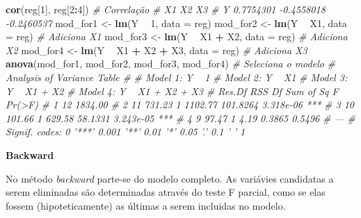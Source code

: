 \documentclass[
]{book}
\newenvironment{Shaded}{\begin{snugshade}}{\end{snugshade}}
\newcommand{\CommentTok}[1]{\textcolor[rgb]{0.56,0.35,0.01}{\textit{#1}}}
\newcommand{\DataTypeTok}[1]{\textcolor[rgb]{0.13,0.29,0.53}{#1}}
\newcommand{\DecValTok}[1]{\textcolor[rgb]{0.00,0.00,0.81}{#1}}
\newcommand{\KeywordTok}[1]{\textcolor[rgb]{0.13,0.29,0.53}{\textbf{#1}}}
\newcommand{\NormalTok}[1]{#1}
\newcommand{\OperatorTok}[1]{\textcolor[rgb]{0.81,0.36,0.00}{\textbf{#1}}}
\newcommand{\StringTok}[1]{\textcolor[rgb]{0.31,0.60,0.02}{#1}}
\begin{document}
\begin{Shaded}
\begin{Highlighting}[]
\KeywordTok{cor}\NormalTok{(reg[}\DecValTok{1}\NormalTok{], reg[}\DecValTok{2}\OperatorTok{:}\DecValTok{4}\NormalTok{]) }\CommentTok{# Correlação}
\CommentTok{#          X1         X2         X3}
\CommentTok{# Y 0.7754301 -0.4558018 -0.2460537}
\NormalTok{mod_for1 <-}\StringTok{ }\KeywordTok{lm}\NormalTok{(Y }\OperatorTok{~}\StringTok{ }\DecValTok{1}\NormalTok{, }\DataTypeTok{data =}\NormalTok{ reg)}
\NormalTok{mod_for2 <-}\StringTok{ }\KeywordTok{lm}\NormalTok{(Y }\OperatorTok{~}\StringTok{ }\NormalTok{X1, }\DataTypeTok{data =}\NormalTok{ reg) }\CommentTok{# Adiciona X1 }
\NormalTok{mod_for3 <-}\StringTok{ }\KeywordTok{lm}\NormalTok{(Y }\OperatorTok{~}\StringTok{ }\NormalTok{X1 }\OperatorTok{+}\StringTok{ }\NormalTok{X2, }\DataTypeTok{data =}\NormalTok{ reg)  }\CommentTok{# Adiciona X2 }
\NormalTok{mod_for4 <-}\StringTok{ }\KeywordTok{lm}\NormalTok{(Y }\OperatorTok{~}\StringTok{ }\NormalTok{X1 }\OperatorTok{+}\StringTok{ }\NormalTok{X2 }\OperatorTok{+}\StringTok{ }\NormalTok{X3, }\DataTypeTok{data =}\NormalTok{ reg)  }\CommentTok{# Adiciona X3 }
\KeywordTok{anova}\NormalTok{(mod_for1, mod_for2, mod_for3, mod_for4)  }\CommentTok{# Seleciona o modelo }
\CommentTok{# Analysis of Variance Table}
\CommentTok{# }
\CommentTok{# Model 1: Y ~ 1}
\CommentTok{# Model 2: Y ~ X1}
\CommentTok{# Model 3: Y ~ X1 + X2}
\CommentTok{# Model 4: Y ~ X1 + X2 + X3}
\CommentTok{#   Res.Df     RSS Df Sum of Sq        F    Pr(>F)    }
\CommentTok{# 1     12 1834.00                                    }
\CommentTok{# 2     11  731.23  1   1102.77 101.8264 3.318e-06 ***}
\CommentTok{# 3     10  101.66  1    629.58  58.1331 3.243e-05 ***}
\CommentTok{# 4      9   97.47  1      4.19   0.3865    0.5496    }
\CommentTok{# ---}
\CommentTok{# Signif. codes:  0 '***' 0.001 '**' 0.01 '*' 0.05 '.' 0.1 ' ' 1}
\end{Highlighting}
\end{Shaded}

\textbf{Backward} 

No método \emph{backward} parte-se do modelo completo. As variávies candidatas a serem eliminadas são determinadas através do teste F parcial, como se elas fossem (hipoteticamente) as últimas a serem incluidas no modelo.
\end{document}
